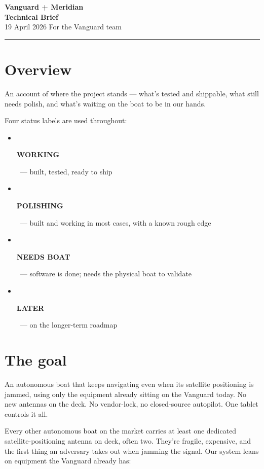 \documentclass[10pt,a4paper]{article}
\newcommand{\statusbuilt}{{\small\color{white}\colorbox{mSafe}{\,\strut\bfseries\sffamily WORKING\,}}}
\newcommand{\statustuning}{{\small\color{white}\colorbox{mWarn}{\,\strut\bfseries\sffamily POLISHING\,}}}
\newcommand{\statushardware}{{\small\color{white}\colorbox{mDim}{\,\strut\bfseries\sffamily NEEDS BOAT\,}}}
\newcommand{\statusfuture}{{\small\color{white}\colorbox{mDim}{\,\strut\bfseries\sffamily LATER\,}}}
\begin{document}
\thispagestyle{empty}

\begin{center}
  {\Huge\bfseries\color{mCyan}Vanguard + Meridian}\\[4pt]
  {\large\bfseries Technical Brief}\\[3pt]
  {\color{mDim}\small 19 April 2026 \quad\textbullet\quad For the Vanguard team}
\end{center}
\vspace{4pt}
\rule{\textwidth}{0.4pt}

\section{Overview}

An account of where the project stands --- what's tested and shippable,
what still needs polish, and what's waiting on the boat to be in our
hands.

Four status labels are used throughout:
\begin{itemize}
\item \statusbuilt\ --- built, tested, ready to ship
\item \statustuning\ --- built and working in most cases, with a known rough edge
\item \statushardware\ --- software is done; needs the physical boat to validate
\item \statusfuture\ --- on the longer-term roadmap
\end{itemize}

\section{The goal}
\begin{tcolorbox}[colframe=mCyan, colback=white, title=\normalsize What we deliver]
An autonomous boat that keeps navigating even when its satellite
positioning is jammed, using only the equipment already sitting on the
Vanguard today. No new antennas on the deck. No vendor-lock, no
closed-source autopilot. One tablet controls it all.
\end{tcolorbox}

Every other autonomous boat on the market carries at least one
dedicated satellite-positioning antenna on deck, often two. They're
fragile, expensive, and the first thing an adversary takes out when
jamming the signal. Our system leans on equipment the Vanguard already
has:
\end{document}
